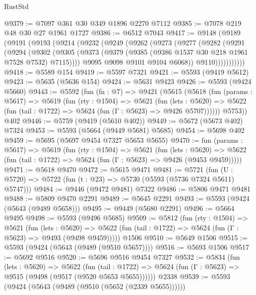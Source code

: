 \begin{lexlean}{RustStd}
\begin{coremodule}
@9379 := @7097 @361 @30 @349 @1896 @2270 @7112
@9385 := @7078 @219 @48 @30 @27 @1961 @1727
@9386 := @6512 @7043
@9417 := @9148
    (@9189
      (@9191
        (@9193
          (@9214
            (@9232
              (@9249
                (@9262
                  (@9273
                    (@9277
                      (@9282
                        (@9291
                          (@9294
                            (@9302
                              (@9305
                                (@9373
                                  (@9379 (@9385 (@9386 @1537 @30 @218 @1961 @7528 @7532) @7115))))
                              @9095
                              @9098
                              @9101
                              @9104
                              @6068))
                          @9110)))))))))))
@9418 := @5589 @154
@9419 := @5597 @7321
@9421 := @5593 (@9419 @5612)
@9423 := @5635 (@5636 @154)
@9424 := @5631 @9423
@9426 := @5593 (@9424 @5660)
@9443 := @5592
    (fun (fn : @7) =>
    @9421
      (@5615
        (@5618
          (fun (params : @5617) =>
          @5619
            (fun (rty : @1504) =>
            @5621
              (fun (lets : @5620) =>
              @5622 (fun (tail : @1722) => @5624 (fun (Γ : @5623) => @9426 @5707))))))
        @5753))
    @402
@9446 := @5759 (@9419 (@5610 @402))
@9449 := @5672 (@5673 @402) @7324
@9453 := @5593 (@5664 (@9449 @5681) @5685)
@9454 := @5698 @402
@9459 := @5695 (@5697 @9454 @7327 @5653 @5655)
@9470 := fun (params : @5617) =>
  @5619
    (fun (rty : @1504) =>
    @5621
      (fun (lets : @5620) =>
      @5622 (fun (tail : @1722) => @5624 (fun (Γ : @5623) => @9426 (@9453 @9459)))))
@9471 := @5618 @9470
@9472 := @5615 @9471
@9481 := @5721 (fun (U : @5720) => @5722 (fun (t : @23) => @5730 (@5593 (@5736 @7324 @5611) @5747)))
@9484 := @9446 (@9472 @9481) @7322
@9486 := @5806 @9471 @9481
@9488 := @5809 @9470 @2291
@9489 := @5645 @2291
@9493 := @5593 (@9424 (@5643 (@9489 @5658)))
@9495 := @9449 (@5680 @2291)
@9496 := @5664 @9495
@9498 := @5593 (@9496 @5685)
@9509 := @5812
    (fun (rty : @1504) =>
    @5621
      (fun (lets : @5620) =>
      @5622 (fun (tail : @1722) => @5624 (fun (Γ : @5623) => @9493 (@9498 @9459)))))
    @1506
@9510 := @5649 @1506
@9515 := @5593 (@9424 (@5643 (@9489 (@9510 @5657))))
@9516 := @5693 @1506
@9517 := @5692 @9516
@9520 := @5696 @9516 @9454 @7327
@9532 := @5834
    (fun (lets : @5620) =>
    @5622
      (fun (tail : @1722) => @5624 (fun (Γ : @5623) => @9515 (@9498 (@9517 (@9520 @5653 @5655))))))
    @2338
@9539 := @5593 (@9424 (@5643 (@9489 (@9510 (@5652 (@2339 @5655))))))

\end{coremodule}
\end{lexlean}
